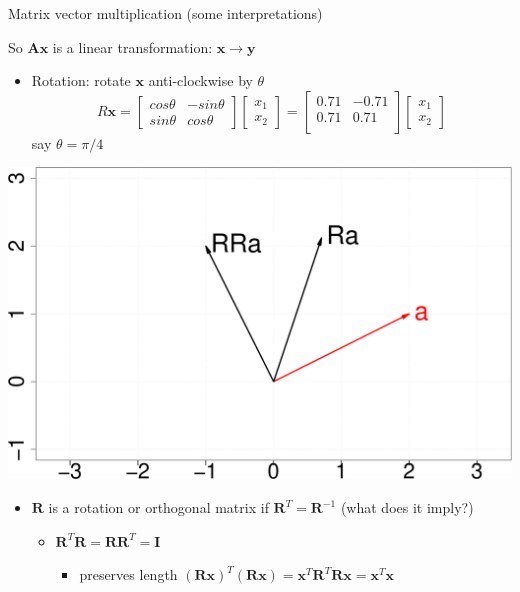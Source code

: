 \documentclass[ignorenonframetext,]{beamer}
\providecommand{\tightlist}{%
  \setlength{\itemsep}{0pt}\setlength{\parskip}{0pt}}
\newcommand{\vv}[1]{\boldsymbol{#1}}
\begin{document}
\begin{frame}{Matrix vector multiplication (some interpretations)}
\protect\hypertarget{matrix-vector-multiplication-some-interpretations}{}

So \(\vv{A}\vv{x}\) is a linear transformation:
\(\vv{x} \rightarrow \vv{y}\)

\begin{itemize}
\tightlist
\item
  Rotation: rotate \(\vv{x}\) anti-clockwise by \(\theta\)
  \[R\vv{x} = \begin{bmatrix} cos\theta & -sin\theta \\
  sin\theta & cos\theta\end{bmatrix} \begin{bmatrix} x_1\\ x_2\end{bmatrix} = \begin{bmatrix}0.71&-0.71 \\0.71&0.71 \\\end{bmatrix} \begin{bmatrix} x_1\\ x_2\end{bmatrix}\]
  say \(\theta = \pi/4\)
\end{itemize}

\begin{center}\includegraphics[width=0.5\linewidth]{math4ml_files/figure-beamer/unnamed-chunk-9-1} \end{center}

\begin{itemize}
\tightlist
\item
  \(\vv{R}\) is a rotation or orthogonal matrix if
  \(\vv{R}^T = \vv{R}^{-1}\) (what does it imply?)

  \begin{itemize}
  \tightlist
  \item
    \(\vv{R}^T\vv{R} = \vv{R}\vv{R}^T =\vv{I}\) \pause 

    \begin{itemize}
    \tightlist
    \item
      preserves length
      \((\vv{R}\vv{x})^T(\vv{R}\vv{x}) = \vv{x}^T\vv{R}^T\vv{R}\vv{x} = \vv{x}^T\vv{x}\)
    \end{itemize}
  \end{itemize}
\end{itemize}

\end{frame}
\end{document}
